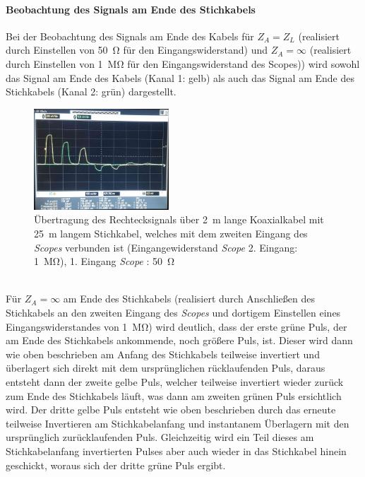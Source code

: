 \documentclass[a4paper,twoside,final]{article}
\begin{document}
\paragraph{Beobachtung des Signals am Ende des Stichkabels }
Bei der Beobachtung des Signals am Ende des Kabels für $Z_A = Z_L$ (realisiert durch Einstellen von \SI{50}{\ohm} für den Eingangswiderstand) und $Z_A = \infty$ (realisiert durch Einstellen von \SI{1}{\mega\ohm} für den Eingangswiderstand des Scopes)) wird sowohl das Signal am Ende des Kabels (Kanal 1: gelb) als auch das Signal am Ende des Stichkabels (Kanal 2: grün) dargestellt.
\begin{figure}[htp]
    \centering
        \includegraphics[width=0.45\textwidth]{Bilder/Bild7.jpg}
    \caption{Übertragung des Rechtecksignals über \SI{2}{\metre} lange Koaxialkabel mit \SI{25}{\metre} langem Stichkabel, welches mit dem zweiten Eingang des \textit{Scopes} verbunden ist (Eingangewiderstand \textit{Scope} 2. Eingang: \SI{1}{\mega\ohm}), 1. Eingang \textit{Scope} : \SI{50}{\ohm}}
\end{figure}\\
Für $Z_A = \infty$ am Ende des Stichkabels (realisiert durch Anschließen des Stichkabels an den zweiten Eingang des \textit{Scopes} und dortigem Einstellen eines Eingangswiderstandes von \SI{1}{\mega\ohm}) wird deutlich, dass der erste grüne Puls, der am Ende des Stichkabels ankommende, noch größere Puls, ist. Dieser wird dann wie oben beschrieben am Anfang des Stichkabels teilweise invertiert und überlagert sich direkt mit dem ursprünglichen rücklaufenden Puls, daraus entsteht dann der zweite gelbe Puls, welcher teilweise invertiert wieder zurück zum Ende des Stichkabels läuft, was dann am zweiten grünen Puls ersichtlich wird. Der dritte gelbe Puls entsteht wie oben beschrieben durch das erneute teilweise Invertieren am Stichkabelanfang und instantanem Überlagern mit den ursprünglich zurücklaufenden Puls. Gleichzeitig wird ein Teil dieses am Stichkabelanfang invertierten Pulses aber auch wieder in das Stichkabel hinein geschickt, woraus sich der dritte grüne Puls ergibt.
\end{document}
